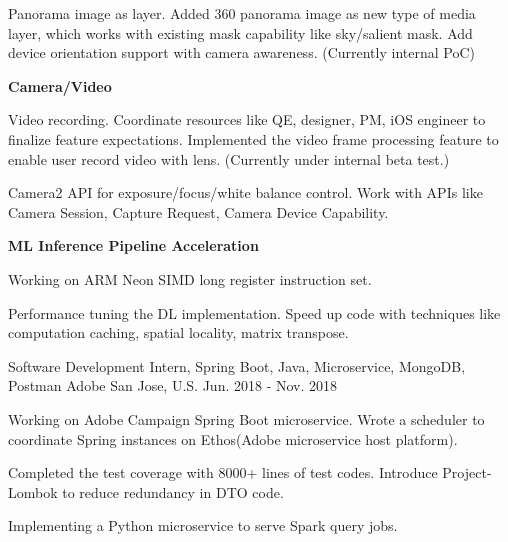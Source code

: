 \begin{cventries}
{\begin{cvitems}
\item {Panorama image as layer. Added 360 panorama image as new type of media layer, which works with existing mask capability like sky/salient mask. Add device orientation support with camera awareness. (Currently internal PoC)}
{\setlength\itemindent{-2ex} \item[] \textbf{Camera/Video}}
\item {Video recording. Coordinate resources like QE, designer, PM, iOS engineer to finalize feature expectations. Implemented the video frame processing feature to enable user record video with lens. (Currently under internal beta test.)}
\item {Camera2 API for exposure/focus/white balance control. Work with APIs like Camera Session, Capture Request, Camera Device Capability.}
{\setlength\itemindent{-2ex} \item[] \textbf{ML Inference Pipeline Acceleration}}
\item {Working on ARM Neon SIMD long register instruction set.}
\item {Performance tuning the DL implementation. Speed up code with techniques like computation caching, spatial locality, matrix transpose.}
\end{cvitems}
}





\cventry
{Software Development Intern, Spring Boot, Java, Microservice, MongoDB, Postman} %
{Adobe} %
{San Jose, U.S.} %
{Jun. 2018 - Nov. 2018} %
{ %
\begin{cvitems}
\item {Working on Adobe Campaign Spring Boot microservice. Wrote a scheduler to coordinate Spring instances on Ethos(Adobe microservice host platform).}
\item {Completed the test coverage with 8000+ lines of test codes. Introduce Project-Lombok to reduce redundancy in DTO code.}
\item {Implementing a Python microservice to serve Spark query jobs.}
\end{cvitems}
}



\end{cventries}
